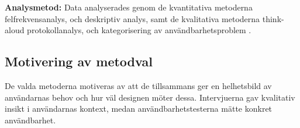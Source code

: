 \textbf{Analysmetod:} Data analyserades genom de kvantitativa metoderna felfrekvensanalys, och deskriptiv analys, samt de kvalitativa metoderna think-aloud protokollanalys, och kategorisering av användbarhetsproblem .

\subsection{Motivering av metodval}

De valda metoderna motiveras av att de tillsammans ger en helhetsbild av användarnas behov och hur väl designen möter dessa. Intervjuerna gav kvalitativ insikt i användarnas kontext, medan användbarhetstesterna mätte konkret användbarhet.